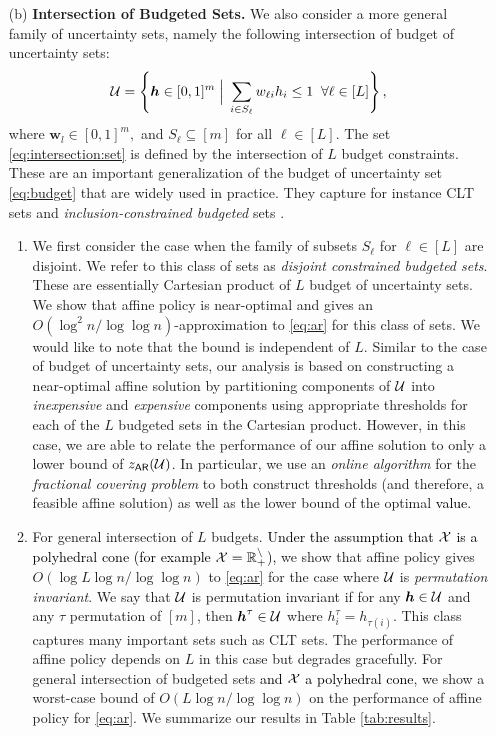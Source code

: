 \documentclass[moor]{informs1}              %
\newcommand{\mb}[1]{\ensuremath{\boldsymbol{#1}}}
\newcommand*{\red}{\textcolor{black}}
\begin{document}
\begin{enumerate}
\vspace{2mm}
\item [(b)]{\bf Intersection of Budgeted Sets.} 
We also consider a more general family of uncertainty sets, namely the following intersection of budget of uncertainty sets:
\begin{equation} \label{eq:intersection:set}
{\cal U} = \left\{ \mb h \in [0,1]^m  \; \Big\vert \;  \sum_{i \in S_{\ell}} w_{ \ell i} h_i \leq 1  \;\;  \forall \ell \in  [L] \right\},
\end{equation}
where $ \mb w_l \in [0,1]^m,$ and $S_{\ell} \subseteq [m]$ for all $\ell \in [L]$. The set  \eqref{eq:intersection:set} is defined by the intersection of $L$ budget constraints. These are an important generalization of the budget of uncertainty set \eqref{eq:budget} that are widely used in practice. They capture for instance CLT sets \cite{bandi2012tractable}
 and {\em inclusion-constrained budgeted} sets \cite{gounaris2014adaptive}. 
 \begin{enumerate}[label=(\roman*)]
 \item  We first consider the case when the family of subsets $S_{\ell}$ for $\ell \in [L]$ are disjoint. We refer to this class of sets as {\em disjoint constrained budgeted sets}. These are essentially Cartesian product of $L$ budget of uncertainty sets. We show that affine policy is near-optimal and gives an $O \left( \log^2 n/ \log \log n  \right)$-approximation to \eqref{eq:ar} for this class of sets. We would like to note that the bound is independent of $L$.  Similar to the case of budget of uncertainty sets, our analysis is based on constructing a near-optimal affine solution by partitioning components of ${\cal U}$ into {\em inexpensive} and {\em expensive} components using appropriate thresholds for each of the $L$ budgeted sets in the Cartesian product. However, in this case, we are able to relate the performance of our affine solution to only a lower bound of $z_{\sf AR}( {\cal U})$. In particular, we use an {\em online algorithm} for the {\em fractional covering problem} to both construct thresholds (and therefore, a feasible affine solution) as well as the lower bound of the optimal \red{value}. 
 
\item For general intersection of $L$ budgets. \red{Under the assumption that $\cal X$ is a polyhedral cone (for example $\cal X = \mathbb{R}_+^n$),}  we show that affine policy gives $O \left(  \log L \log n/ \log \log n  \right)$ to \eqref{eq:ar} for the case where $\cal U$ is {\em permutation invariant}.  We say that $\cal U$ is permutation invariant if for any $\mb h \in {\cal U}$ and any $\tau $ permutation of $[m]$, then $\mb h^{\tau}\in{\cal U}$ where $ h^\tau_i= h_{\tau(i)}$. This class captures many important sets such as CLT sets. The performance of affine policy depends on $L$ in this case but degrades gracefully. For general intersection of budgeted sets \red{and $\cal X$  a polyhedral cone}, we show  a worst-case bound of $O \left(  L \log n/ \log \log n  \right)$ on the performance of affine policy for \eqref{eq:ar}. We summarize our results in Table \ref{tab:results}.
 \end{enumerate}
 

\end{enumerate}
\end{document}
